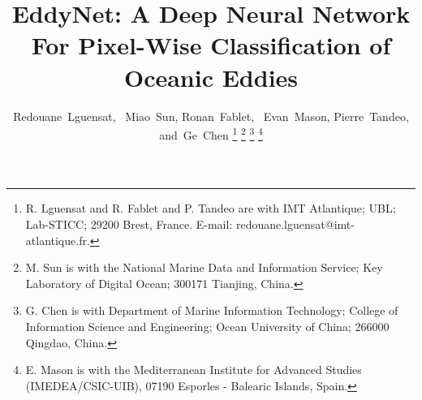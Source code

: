 \documentclass[journal]{IEEEtran}
\begin{document}
%
\title{EddyNet: A Deep Neural Network For Pixel-Wise Classification of Oceanic Eddies}
%
%
%

\author{Redouane~Lguensat,~
		Miao~Sun, %
        Ronan~Fablet,~  
        Evan~Mason, %
        Pierre~Tandeo, %
        and~Ge~Chen%
\thanks{R. Lguensat and R. Fablet and P. Tandeo are with IMT Atlantique; UBL; Lab-STICC; 29200 Brest, France. E-mail: redouane.lguensat@imt-atlantique.fr.}%
\thanks{M. Sun is with the National Marine Data and Information Service; Key Laboratory of Digital Ocean; 300171 Tianjing, China.}%
\thanks{G. Chen is with Department of Marine Information Technology; College of Information Science and Engineering; Ocean University of China; 266000 Qingdao, China.}%
\thanks{E. Mason is with the Mediterranean Institute for Advanced Studies (IMEDEA/CSIC-UIB), 07190 Esporles - Balearic Islands, Spain.}%

}

% 
%
\end{document}
